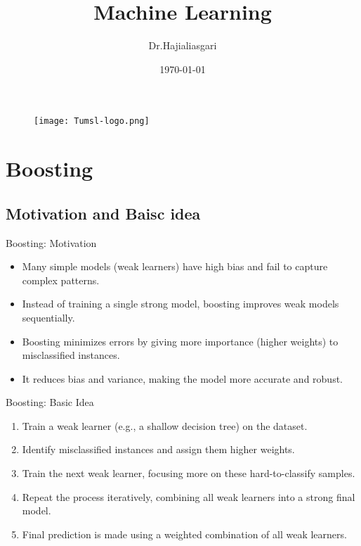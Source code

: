 \documentclass[serif, aspectratio=169]{beamer}
\author{Dr.Hajialiasgari}
\title{Machine Learning}
\institute{
    Tehran University \\
    Of\\
    Medical Science
}
\date{\small \today}
\begin{document}
\begin{frame}
    \titlepage
    \vspace*{-0.6cm}
    \begin{figure}[htpb]
        \begin{center}
            \texttt{[image: Tumsl-logo.png]}
        \end{center}
    \end{figure}
\end{frame}

\begin{frame}    
\tableofcontents[sectionstyle=show, subsectionstyle=show/shaded/hide, subsubsectionstyle=show/shaded/hide]
\end{frame}


\section{Boosting}

\subsection{Motivation and Baisc idea}

\begin{frame}{Boosting: Motivation}
    \begin{itemize}
        \item Many simple models (weak learners) have high bias and fail to capture complex patterns.
        \item Instead of training a single strong model, boosting improves weak models sequentially.
        \item Boosting minimizes errors by giving more importance (higher weights) to misclassified instances.
        \item It reduces bias and variance, making the model more accurate and robust.
    \end{itemize}
\end{frame}

\begin{frame}{Boosting: Basic Idea}
    \begin{enumerate}
        \item Train a weak learner (e.g., a shallow decision tree) on the dataset.
        \item Identify misclassified instances and assign them higher weights.
        \item Train the next weak learner, focusing more on these hard-to-classify samples.
        \item Repeat the process iteratively, combining all weak learners into a strong final model.
        \item Final prediction is made using a weighted combination of all weak learners.
    \end{enumerate}
\end{frame}
\end{document}
